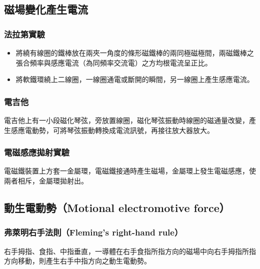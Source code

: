 \documentclass[a4paper,12pt]{report}
\begin{document}
\begin{itemize}
\subsection{磁場變化產生電流}
\subsubsection{法拉第實驗}
\begin{itemize}
\item 將繞有線圈的鐵棒放在兩夾一角度的條形磁鐵棒的兩同極磁極間，兩磁鐵棒之張合頻率與感應電流（為同頻率交流電）之方均根電流呈正比。
\item 將軟鐵環繞上二線圈，一線圈通電或斷開的瞬間，另一線圈上產生感應電流。
\end{itemize}
\subsubsection{電吉他}
電吉他上有一小段磁化琴弦，旁放置線圈，磁化琴弦振動時線圈的磁通量改變，產生感應電動勢，可將琴弦振動轉換成電流訊號，再接往放大器放大。
\subsubsection{電磁感應拋射實驗}
電磁鐵裝置上方套一金屬環，電磁鐵接通時產生磁場，金屬環上發生電磁感應，使兩者相斥，金屬環拋射出。
\subsection{動生電動勢（Motional electromotive force）}
\subsubsection{弗萊明右手法則（Fleming's right-hand rule）}
右手拇指、食指、中指垂直，一導體在右手食指所指方向的磁場中向右手拇指所指方向移動，則產生右手中指方向之動生電動勢。

\end{itemize}
\end{document}
